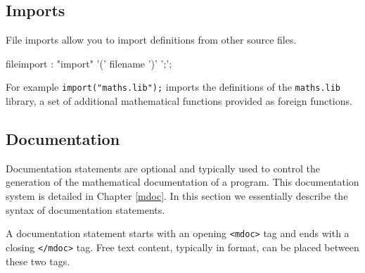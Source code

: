 \subsection{Imports}

File imports allow you to import definitions from other source files.  


\begin{rail}
fileimport : "import" '(' filename ')' ';';
\end{rail}

For example \lstinline{import("maths.lib");} imports the definitions of the \lstinline{maths.lib} library, a set of additional mathematical functions provided as foreign functions.

\subsection{Documentation}
\label{sec-documentation}

Documentation statements are optional and typically used to control the generation of the mathematical documentation of a \faust program. This documentation system is detailed in Chapter \ref{mdoc}. In this section we essentially describe the syntax of documentation statements.

A documentation statement starts with an opening \lstinline'<mdoc>' tag and ends with a closing \lstinline'</mdoc>' tag. Free text content, typically in \latex format, can be placed between these two tags. 


